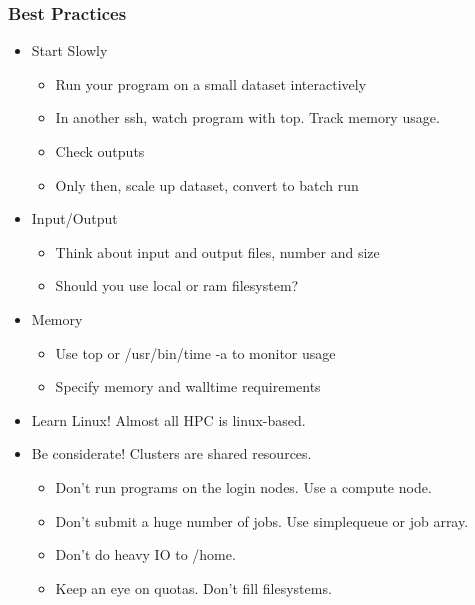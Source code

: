 \documentclass[10pt]{beamer}
\begin{document}
\begin{frame}[fragile]
\frametitle{Best Practices}

\begin{itemize}
\item Start Slowly
\begin{itemize}
\item Run your program on a small dataset interactively
\item In another ssh, watch program with top.  Track memory usage.
\item Check outputs
\item Only then, scale up dataset, convert to batch run
\end{itemize}
\item Input/Output
\begin{itemize}
\item Think about input and output files, number and size
\item Should you use local or ram filesystem? 
\end{itemize}
\item Memory

\begin{itemize}
\item Use top or /usr/bin/time -a to monitor usage
\item Specify memory and walltime requirements
\end{itemize}

\item Learn Linux! Almost all HPC is linux-based.
\item Be considerate!  Clusters are shared resources.

\begin{itemize}
\item Don't run programs on the login nodes.  Use a compute node.
\item Don't submit a huge number of jobs.  Use simplequeue or job array.
\item Don't do heavy IO to /home.
\item Keep an eye on quotas.  Don't fill filesystems.
\end{itemize}
\end{itemize}

\end{frame}
\end{document}
